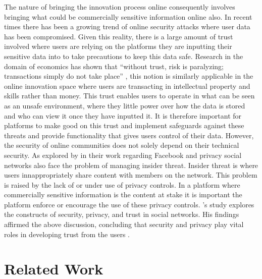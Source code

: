 The nature of bringing the innovation process online consequently involves bringing what could be commercially sensitive information online also. In recent times there has been a growing trend of online security attacks where user data has been compromised. Given this reality, there is a large amount of trust involved where users are relying on the platforms they are inputting their sensitive data into to take precautions to keep this data safe. Research in the domain of economics has shown that ``without trust, risk is paralyzing; transactions simply do not take place'' \cite{boyd2002community}, this notion is similarly applicable in the online innovation space where users are transacting in intellectual property and skills rather than money. This trust enables users to operate in what can be seen as an unsafe environment, where they little power over how the data is stored and who can view it once they have inputted it. It is therefore important for platforms to make good on this trust and implement safeguards against these threats and provide functionality that gives users control of their data.
\newline
However, the security of online communities does not solely depend on their technical security. As explored by \citeauthor{johnson2012facebook} in their work regarding Facebook and privacy \cite{johnson2012facebook} social networks also face the problem of managing insider threat. Insider threat is where users innappropriately share content with members on the network. This problem is raised by the lack of or under use of privacy controls. In a platform where commercially sensitive information is the content at stake it is important the platform enforce or encourage the use of these privacy controls.
\newline
\citeauthor{shin2010effects}'s study explores the constructs of security, privacy, and trust in social networks. His findings affirmed the above discussion, concluding that security and privacy play vital roles in developing trust from the users \cite{shin2010effects}.

\section{Related Work}

